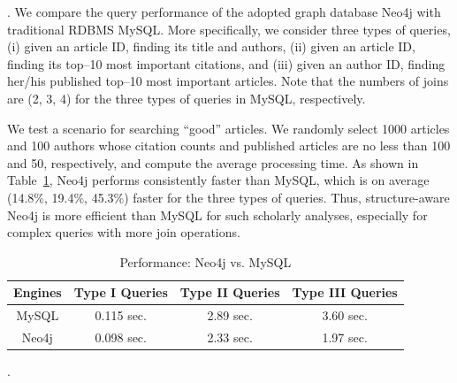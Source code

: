 .
We compare the query performance of the adopted graph database Neo4j with traditional RDBMS MySQL. More specifically, we consider three types of queries, \ie (i) given an article ID, finding its title and authors, (ii)  given an article ID, finding its top--10 most important citations, and (iii) given an author ID, finding her/his published top--10 most important articles. Note that the numbers of joins are (2, 3, 4) for the three types of queries in MySQL, respectively.

We test a scenario for searching ``good'' articles. We randomly select 1000 articles and 100 authors whose citation counts and published articles are no less than 100 and 50, respectively, and compute the average processing time. As shown in Table~\ref{tab-compare}, Neo4j performs consistently faster than MySQL, which is on average (14.8\%, 19.4\%, 45.3\%) faster for the three types of queries.
Thus, structure-aware Neo4j is more efficient than MySQL for such scholarly analyses, especially for complex queries with more join operations.


\begin{table}[t!]
\begin{center}
\caption{Performance: Neo4j vs. MySQL}
\label{tab-compare}
\begin{scriptsize}

\begin{tabular}{|c|c|c|c|} %
\hline
{Engines} & {Type I Queries} & {Type II Queries} & {Type III  Queries}\\
\hline %
MySQL & 0.115 sec.  & 2.89 sec. & 3.60 sec. \\
\hline
Neo4j & 0.098 sec.  & 2.33 sec. & 1.97 sec. \\
\hline
\end{tabular}

\end{scriptsize}
\vspace{-4.5ex}
\end{center}
\end{table}

.


